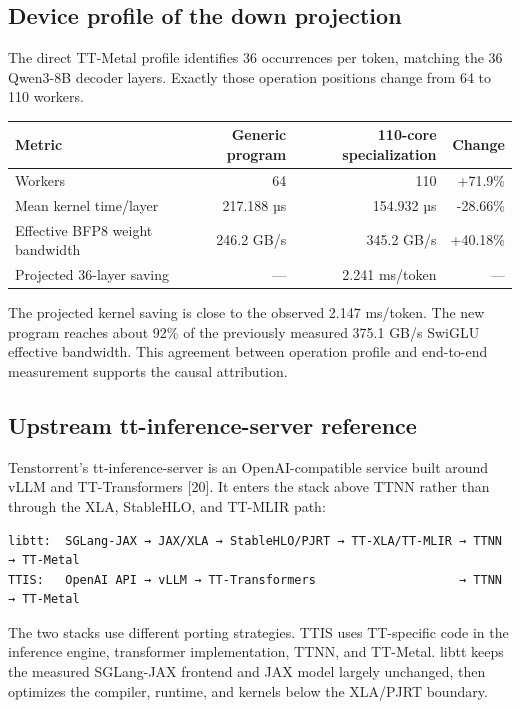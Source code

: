 \documentclass[
  10pt,
  american,
  10pt,
  letterpaper]{article}
\begin{document}
\hypertarget{device-profile-of-the-down-projection}{%
\subsection{Device profile of the down
projection}\label{device-profile-of-the-down-projection}}

The direct TT-Metal profile identifies 36 occurrences per token,
matching the 36 Qwen3-8B decoder layers. Exactly those operation
positions change from 64 to 110 workers.

\begin{longtable}[]{@{}lrrr@{}}
\toprule
Metric & Generic program & 110-core specialization &
Change\tabularnewline
\midrule
\endhead
Workers & 64 & 110 & +71.9\%\tabularnewline
Mean kernel time/layer & 217.188 µs & 154.932 µs &
-28.66\%\tabularnewline
Effective BFP8 weight bandwidth & 246.2 GB/s & 345.2 GB/s &
+40.18\%\tabularnewline
Projected 36-layer saving & --- & 2.241 ms/token & ---\tabularnewline
\bottomrule
\end{longtable}

The projected kernel saving is close to the observed 2.147 ms/token. The
new program reaches about 92\% of the previously measured 375.1 GB/s
SwiGLU effective bandwidth. This agreement between operation profile and
end-to-end measurement supports the causal attribution.

\hypertarget{upstream-tt-inference-server-reference}{%
\subsection{Upstream tt-inference-server
reference}\label{upstream-tt-inference-server-reference}}

Tenstorrent's tt-inference-server is an OpenAI-compatible service built
around vLLM and TT-Transformers {[}20{]}. It enters the stack above TTNN
rather than through the XLA, StableHLO, and TT-MLIR path:

\begin{verbatim}
libtt:  SGLang-JAX → JAX/XLA → StableHLO/PJRT → TT-XLA/TT-MLIR → TTNN → TT-Metal
TTIS:   OpenAI API → vLLM → TT-Transformers                    → TTNN → TT-Metal
\end{verbatim}

The two stacks use different porting strategies. TTIS uses TT-specific
code in the inference engine, transformer implementation, TTNN, and
TT-Metal. libtt keeps the measured SGLang-JAX frontend and JAX model
largely unchanged, then optimizes the compiler, runtime, and kernels
below the XLA/PJRT boundary.
\end{document}
